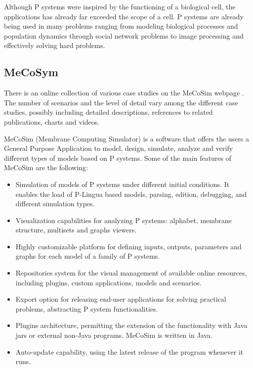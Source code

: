 Although P systems were inspired by the functioning of a biological cell, the applications has already far exceeded the scope of a cell. P systems are already being used in many problems ranging from modeling biological processes and population dynamics through social network problems to image processing and effectively solving hard problems.

\subsection{MeCoSym} %
\label{sub:mecosym}

There is an online collection of various case studies on the MeCoSim webpage \cite{MeCoSimWeb}. The number of scenarios and the level of detail vary among the different case studies, possibly including detailed descriptions, references to related publications, charts and videos.

MeCoSim (Membrane Computing Simulator) \cite{Perez10MeCoSim} is a software that offers the users a General Purpose Application to model, design, simulate, analyze and verify different types of models based on P systems. Some of the main features of MeCoSim are the following:
\begin{itemize}
  \item Simulation of models of P systems under different initial conditions. It enables the load of P-Lingua based models, parsing, edition, debugging, and different simulation types.
  \item Visualization capabilities for analyzing P systems: alphabet, membrane structure, multisets and graphs viewers.
  \item Highly customizable platform for defining inputs, outputs, parameters and graphs for each model of a family of P systems.
  \item Repositories system for the visual management of available online resources, including plugins, custom applications, models and scenarios.
  \item Export option for releasing end-user applications for solving practical problems, abstracting P system functionalities.
  \item Plugins architecture, permitting the extension of the functionality with Java jars or external non-Java programs. MeCoSim is written in Java.
  \item Auto-update capability, using the latest release of the program whenever it runs.
\end{itemize}

